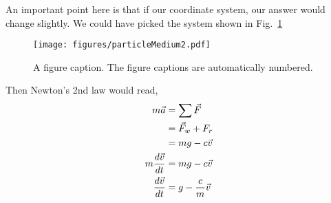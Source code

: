 \begin{subquestions}
An important point here is that if our coordinate system, our answer would change slightly. We could have picked the system shown in Fig.~\ref{2015:q5:fig:particle2}
\begin{figure}
\begin{center}
\texttt{[image: figures/particleMedium2.pdf]}
\caption{\label{2015:q5:fig:particle2} A figure caption. The figure captions are
automatically numbered.}
\end{center}
\end{figure}
Then Newton's 2nd law would read,
\begin{align}
   m \vec{a} &= \sum \vec{F} \nonumber\\
   &= \vec{F}_w + F_r \nonumber \\
   &= m g - c \vec{v} \nonumber \\
   m \frac{d\vec{v}}{dt} &= mg - c \vec{v} \nonumber \\
   \frac{d\vec{v}}{dt} &= g - \frac{c}{m} \vec{v} 
\end{align}


\end{subquestions}

